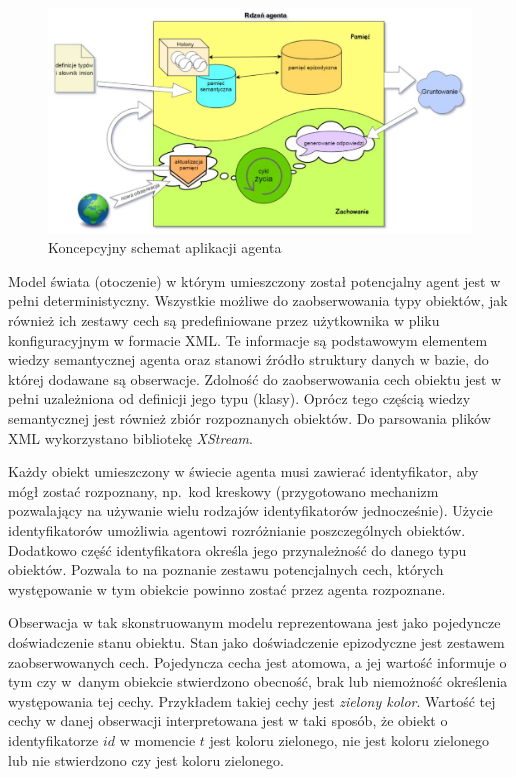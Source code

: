 \begin{figure}  
	\centering\includegraphics[width=.9\textwidth]{img/agent-schemat}
	\caption{Koncepcyjny schemat aplikacji agenta \cite{raport}}
	\label{rys:schemat}
\end{figure}

Model świata (otoczenie) w którym umieszczony został potencjalny agent jest w pełni deterministyczny. Wszystkie możliwe do zaobserwowania typy obiektów, jak również ich zestawy cech są predefiniowane przez użytkownika w pliku konfiguracyjnym w formacie XML. Te informacje są podstawowym elementem wiedzy semantycznej agenta oraz stanowi źródło struktury danych w bazie, do której dodawane są obserwacje. Zdolność do zaobserwowania cech obiektu jest w pełni uzależniona od definicji jego typu (klasy). Oprócz tego częścią wiedzy semantycznej jest również zbiór rozpoznanych obiektów. Do parsowania plików XML wykorzystano bibliotekę \textit{XStream}.

Każdy obiekt umieszczony w świecie agenta musi zawierać identyfikator, aby mógł zostać rozpoznany, np.\ kod kreskowy (przygotowano mechanizm pozwalający na używanie wielu rodzajów identyfikatorów jednocześnie). Użycie identyfikatorów umożliwia agentowi rozróżnianie poszczególnych obiektów. Dodatkowo część identyfikatora określa jego przynależność do danego typu obiektów. Pozwala to na poznanie zestawu potencjalnych cech, których występowanie w tym obiekcie powinno zostać przez agenta rozpoznane. 

Obserwacja w tak skonstruowanym modelu reprezentowana jest jako pojedyncze doświadczenie stanu obiektu. Stan jako doświadczenie epizodyczne jest zestawem zaobserwowanych cech. Pojedyncza cecha jest atomowa, a jej wartość informuje o tym czy w~danym obiekcie stwierdzono obecność, brak lub niemożność określenia występowania tej cechy. Przykładem takiej cechy jest \textit{zielony kolor}. Wartość tej cechy w danej obserwacji interpretowana jest w taki sposób, że  obiekt o identyfikatorze $ id $ w momencie $ t $ jest koloru zielonego, nie jest koloru zielonego lub nie stwierdzono czy jest koloru zielonego.

